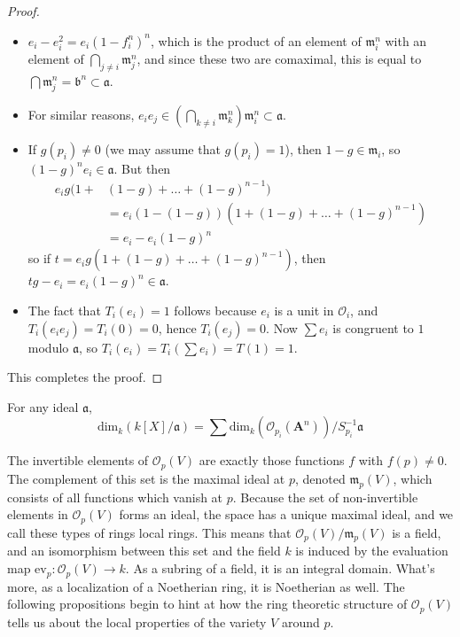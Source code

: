 \begin{proof}
\begin{itemize}
        \item $e_i - e_i^2 = e_i(1 - f_i^n)^n$, which is the product of an element of $\mathfrak{m}_i^n$ with an element of $\bigcap_{j \neq i} \mathfrak{m}_j^n$, and since these two are comaximal, this is equal to $\bigcap \mathfrak{m}_j^n = \mathfrak{b}^n \subset \mathfrak{a}$.

        \item For similar reasons, $e_ie_j \in (\bigcap_{k \neq i} \mathfrak{m}_k^n) \mathfrak{m}_i^n \subset \mathfrak{a}$.

        \item  If $g(p_i) \neq 0$ (we may assume that $g(p_i) = 1$), then $1 - g \in \mathfrak{m}_i$, so $(1-g)^n e_i \in \mathfrak{a}$. But then
    \begin{align*}
        e_i g(1 +& (1-g) + \dots + (1-g)^{n-1})\\
        &= e_i(1 - (1-g))(1 + (1-g) + \dots + (1-g)^{n-1})\\
        &= e_i - e_i (1 - g)^n
    \end{align*}
    so if $t = e_i g(1 + (1-g) + \dots + (1-g)^{n-1})$, then $tg - e_i = e_i(1-g)^n \in \mathfrak{a}$.

    \item The fact that $T_i(e_i) = 1$ follows because $e_i$ is a unit in $\mathcal{O}_i$, and $T_i(e_ie_j) = T_i(0) = 0$, hence $T_i(e_j) = 0$. Now $\sum e_i$ is congruent to $1$ modulo $\mathfrak{a}$, so $T_i(e_i) = T_i(\sum e_i) = T(1) = 1$.
    \end{itemize}
    This completes the proof.
\end{proof}

\begin{corollary}
    For any ideal $\mathfrak{a}$,
    \[ \text{dim}_k(k[X]/\mathfrak{a}) = \sum \text{dim}_k(\mathcal{O}_{p_i}(\mathbf{A}^n))/S_{p_i}^{-1} \mathfrak{a} \]
\end{corollary}

The invertible elements of $\mathcal{O}_p(V)$ are exactly those functions $f$ with $f(p) \neq 0$. The complement of this set is the maximal ideal at $p$, denoted $\mathfrak{m}_p(V)$, which consists of all functions which vanish at $p$. Because the set of non-invertible elements in $\mathcal{O}_p(V)$ forms an ideal, the space has a unique maximal ideal, and we call these types of rings local rings. This means that $\mathcal{O}_p(V)/\mathfrak{m}_p(V)$ is a field, and an isomorphism between this set and the field $k$ is induced by the evaluation map $\text{ev}_p: \mathcal{O}_p(V) \to k$. As a subring of a field, it is an integral domain. What's more, as a localization of a Noetherian ring, it is Noetherian as well. The following propositions begin to hint at how the ring theoretic structure of $\mathcal{O}_p(V)$ tells us about the local properties of the variety $V$ around $p$.

